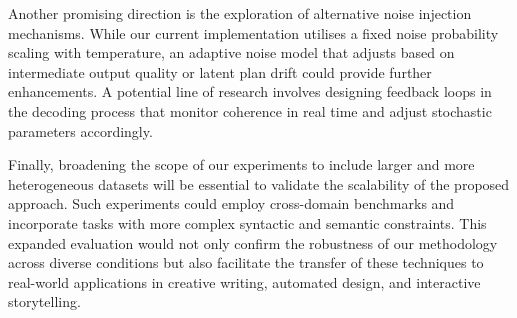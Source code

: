 \documentclass[11pt]{article}
\begin{document}
Another promising direction is the exploration of alternative noise injection mechanisms. While our current implementation utilises a fixed noise probability scaling with temperature, an adaptive noise model that adjusts based on intermediate output quality or latent plan drift could provide further enhancements. A potential line of research involves designing feedback loops in the decoding process that monitor coherence in real time and adjust stochastic parameters accordingly.

Finally, broadening the scope of our experiments to include larger and more heterogeneous datasets will be essential to validate the scalability of the proposed approach. Such experiments could employ cross-domain benchmarks and incorporate tasks with more complex syntactic and semantic constraints. This expanded evaluation would not only confirm the robustness of our methodology across diverse conditions but also facilitate the transfer of these techniques to real-world applications in creative writing, automated design, and interactive storytelling.
\end{document}
